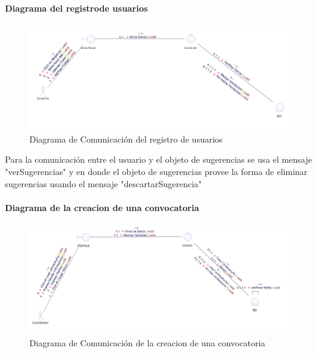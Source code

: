 \paragraph{Diagrama del registrode usuarios}
\begin{figure}[H]
	\centering
	\includegraphics[width=1\linewidth]{parte2/imgs/DiagramaComunicacion/ComReguU}
	\caption[Diagrama de Comunicacion del registro de usuarios]{Diagrama de Comunicación del registro de usuarios}
	\label{fig:diagramaDeComunicacion3}
\end{figure}

Para la comunicación entre el usuario y el objeto de sugerencias se usa el mensaje "verSugerencias" y en donde el objeto de sugerencias provee la forma de eliminar sugerencias usando el mensaje "descartarSugerencia"

\paragraph{Diagrama de la creacion de una convocatoria}
\begin{figure}[H]
	\centering
	\includegraphics[width=1\linewidth]{parte2/imgs/DiagramaComunicacion/ComCreConv}
	\caption[Diagrama de Comunicacion cfracion Covoactoria]{Diagrama de Comunicación de la creacion de una convocatoria}
	\label{fig:diagramaDeComunicacion5}
\end{figure}

